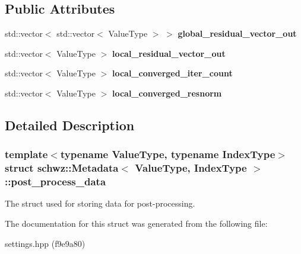 \subsection*{Public Attributes}
\begin{DoxyCompactItemize}
\item 
\mbox{\label{structschwz_1_1Metadata_1_1post__process__data_a3cd4dc39548794213196924e925947e4}} 
std\+::vector$<$ std\+::vector$<$ Value\+Type $>$ $>$ {\bfseries global\+\_\+residual\+\_\+vector\+\_\+out}
\item 
\mbox{\label{structschwz_1_1Metadata_1_1post__process__data_ac508dd9baaf55fe3eefaac84a081ea07}} 
std\+::vector$<$ Value\+Type $>$ {\bfseries local\+\_\+residual\+\_\+vector\+\_\+out}
\item 
\mbox{\label{structschwz_1_1Metadata_1_1post__process__data_ae089ea8c22e004373eb6f53c2db01383}} 
std\+::vector$<$ Value\+Type $>$ {\bfseries local\+\_\+converged\+\_\+iter\+\_\+count}
\item 
\mbox{\label{structschwz_1_1Metadata_1_1post__process__data_af03f16caf28849a9b1946c52d7d628fb}} 
std\+::vector$<$ Value\+Type $>$ {\bfseries local\+\_\+converged\+\_\+resnorm}
\end{DoxyCompactItemize}


\subsection{Detailed Description}
\subsubsection*{template$<$typename Value\+Type, typename Index\+Type$>$\newline
struct schwz\+::\+Metadata$<$ Value\+Type, Index\+Type $>$\+::post\+\_\+process\+\_\+data}

The struct used for storing data for post-\/processing. 

The documentation for this struct was generated from the following file\+:\begin{DoxyCompactItemize}
\item 
settings.\+hpp (f9e9a80)\end{DoxyCompactItemize}
